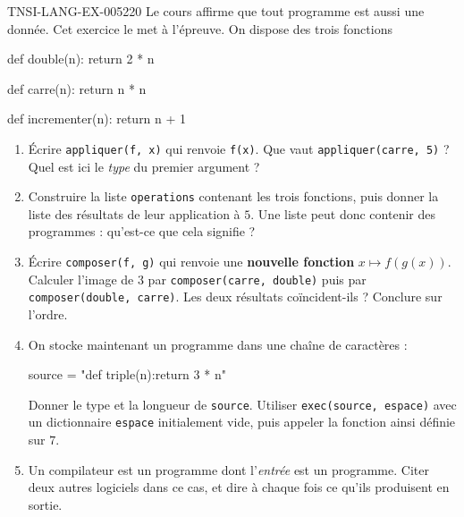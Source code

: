 \begin{exercice}{TNSI-LANG-EX-005}{2}{20}
Le cours affirme que tout programme est aussi une donnée. Cet exercice le met à
l'épreuve. On dispose des trois fonctions
\begin{python}
def double(n):
    return 2 * n

def carre(n):
    return n * n

def incrementer(n):
    return n + 1
\end{python}
\begin{enumerate}
  \item Écrire \lstinline{appliquer(f, x)} qui renvoie \lstinline{f(x)}. Que vaut
    \lstinline{appliquer(carre, 5)} ? Quel est ici le \emph{type} du premier
    argument ?
  \item Construire la liste \lstinline{operations} contenant les trois fonctions,
    puis donner la liste des résultats de leur application à $5$. Une liste peut
    donc contenir des programmes : qu'est-ce que cela signifie ?
  \item Écrire \lstinline{composer(f, g)} qui renvoie une \textbf{nouvelle
    fonction} $x\mapsto f(g(x))$. Calculer l'image de $3$ par
    \lstinline{composer(carre, double)} puis par \lstinline{composer(double, carre)}.
    Les deux résultats coïncident-ils ? Conclure sur l'ordre.
  \item On stocke maintenant un programme dans une chaîne de caractères :
    \begin{python}
source = "def triple(n):\n    return 3 * n\n"
    \end{python}
    Donner le type et la longueur de \lstinline{source}. Utiliser
    \lstinline{exec(source, espace)} avec un dictionnaire \lstinline{espace}
    initialement vide, puis appeler la fonction ainsi définie sur $7$.
  \item Un compilateur est un programme dont l'\emph{entrée} est un programme.
    Citer deux autres logiciels dans ce cas, et dire à chaque fois ce qu'ils
    produisent en sortie.
\end{enumerate}
\end{exercice}
